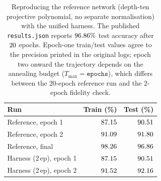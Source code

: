 \begin{table}[t]
\centering
\caption{Reproducing the reference network (depth-ten projective polynomial, no separate normalisation) with the unified harness. The published \texttt{results.json} reports $96.86\%$ test accuracy after $20$ epochs. Epoch-one train/test values agree to the precision printed in the original logs; epoch two onward the trajectory depends on the annealing budget ($T_{\max}=\texttt{epochs}$), which differs between the 20-epoch reference run and the 2-epoch fidelity check.}
\label{tab:ref}
\small
\begin{tabular}{lrr}
\toprule
Run & Train (\%) & Test (\%) \\
\midrule
Reference, epoch 1 & $87.15$ & $90.51$ \\
Reference, epoch 2 & $91.09$ & $91.80$ \\
Reference, final & $98.26$ & $96.86$ \\
\midrule
Harness (2\,ep), epoch 1 & $87.15$ & $90.51$ \\
Harness (2\,ep), epoch 2 & $91.52$ & $92.16$ \\
\bottomrule
\end{tabular}
\end{table}